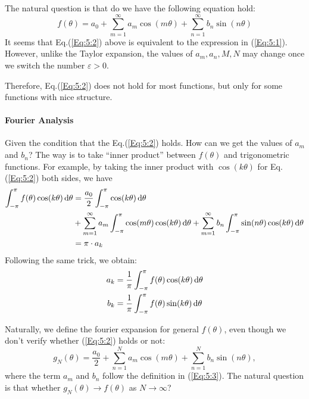 \begin{remark}
The natural question is that do we have the following equation hold:
\begin{equation}\label{Eq:5:2}
f(\theta) = a_0 + \sum_{m=1}^\infty a_m\cos(m\theta) + \sum_{n=1}^\infty b_n\sin(n\theta)
\end{equation}
It seems that Eq.(\ref{Eq:5:2}) above is equivalent to the expression in (\ref{Eq:5:1}). However, unlike the Taylor expansion, the values of $a_m,a_n,M,N$ may change once we switch the number $\varepsilon>0$. 

Therefore, Eq.(\ref{Eq:5:2}) does not hold for most functions, but only for some functions with nice structure.
\end{remark}


\paragraph{Fourier Analysis}
Given the condition that the Eq.(\ref{Eq:5:2}) holds. How can we get the values of $a_m$ and $b_n$? The way is to take ``inner product'' between $f(\theta)$ and trigonometric functions. For example, by taking the inner product with $\cos(k\theta)$ for Eq.(\ref{Eq:5:2}) both sides, we have
\begin{align*}
\int_{-\pi}^\pi f(\theta) \cos(k\theta)\,\mathrm{d}\theta &= \frac{a_0}{2}\int_{-\pi}^\pi\cos(k\theta)\,\mathrm{d}\theta\\&
+
\sum_{m=1}^\infty a_m\int_{-\pi}^\pi\cos(m\theta)\cos(k\theta)\,\mathrm{d}\theta
+
\sum_{m=1}^\infty b_n\int_{-\pi}^\pi\sin(n\theta)\cos(k\theta)\,\mathrm{d}\theta\\
&=\pi\cdot a_k
\end{align*}
Following the same trick, we obtain:
\begin{equation}\label{Eq:5:3}
\begin{aligned}
a_k&=\frac{1}{\pi}\int_{-\pi}^\pi f(\theta)\cos(k\theta)\diff\theta\\
b_k&=\frac{1}{\pi}\int_{-\pi}^\pi f(\theta)\sin(k\theta)\diff\theta
\end{aligned}
\end{equation}

Naturally, we define the fourier expansion for general $f(\theta)$, even though we don't verify whether (\ref{Eq:5:2}) holds or not:
\[
g_N(\theta) = \frac{a_0}{2}+\sum_{n=1}^Na_m\cos(m\theta)+\sum_{n=1}^Nb_n\sin(n\theta),
\]
where the term $a_m$ and $b_n$ follow the definition in (\ref{Eq:5:3}).
The natural question is that whether $g_N(\theta)\to f(\theta)$ as $N\to\infty$?

